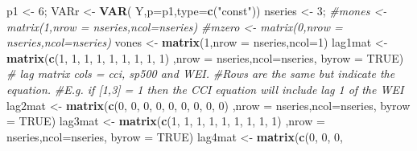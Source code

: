 \documentclass[]{article}
\newenvironment{Shaded}{\begin{snugshade}}{\end{snugshade}}
\newcommand{\KeywordTok}[1]{\textcolor[rgb]{0.13,0.29,0.53}{\textbf{#1}}}
\newcommand{\DataTypeTok}[1]{\textcolor[rgb]{0.13,0.29,0.53}{#1}}
\newcommand{\DecValTok}[1]{\textcolor[rgb]{0.00,0.00,0.81}{#1}}
\newcommand{\StringTok}[1]{\textcolor[rgb]{0.31,0.60,0.02}{#1}}
\newcommand{\CommentTok}[1]{\textcolor[rgb]{0.56,0.35,0.01}{\textit{#1}}}
\newcommand{\OtherTok}[1]{\textcolor[rgb]{0.56,0.35,0.01}{#1}}
\newcommand{\NormalTok}[1]{#1}
\begin{document}
\begin{Shaded}
\begin{Highlighting}[]
\NormalTok{p1        <-}\StringTok{ }\DecValTok{6}\NormalTok{;}
\NormalTok{VARr     <-}\StringTok{ }\KeywordTok{VAR}\NormalTok{( Y,}\DataTypeTok{p=}\NormalTok{p1,}\DataTypeTok{type=}\KeywordTok{c}\NormalTok{(}\StringTok{"const"}\NormalTok{))}
\NormalTok{nseries  <-}\StringTok{ }\DecValTok{3}\NormalTok{;}
\CommentTok{#mones    <- matrix(1,nrow = nseries,ncol=nseries) }
\CommentTok{#mzero    <- matrix(0,nrow = nseries,ncol=nseries) }
\NormalTok{vones    <-}\StringTok{ }\KeywordTok{matrix}\NormalTok{(}\DecValTok{1}\NormalTok{,}\DataTypeTok{nrow =}\NormalTok{ nseries,}\DataTypeTok{ncol=}\DecValTok{1}\NormalTok{)}
\NormalTok{lag1mat <-}\StringTok{ }\KeywordTok{matrix}\NormalTok{(}\KeywordTok{c}\NormalTok{(}\DecValTok{1}\NormalTok{, }\DecValTok{1}\NormalTok{, }\DecValTok{1}\NormalTok{,}
                    \DecValTok{1}\NormalTok{, }\DecValTok{1}\NormalTok{, }\DecValTok{1}\NormalTok{,}
                    \DecValTok{1}\NormalTok{, }\DecValTok{1}\NormalTok{, }\DecValTok{1}\NormalTok{)}
\NormalTok{                  ,}\DataTypeTok{nrow =}\NormalTok{ nseries,}\DataTypeTok{ncol=}\NormalTok{nseries, }\DataTypeTok{byrow =} \OtherTok{TRUE}\NormalTok{) }
\CommentTok{# lag matrix cols = cci, sp500 and WEI. }
\CommentTok{#Rows are the same but indicate the equation.}
\CommentTok{#E.g. if [1,3] = 1 then the CCI equation will include lag 1 of the WEI}
\NormalTok{lag2mat <-}\StringTok{ }\KeywordTok{matrix}\NormalTok{(}\KeywordTok{c}\NormalTok{(}\DecValTok{0}\NormalTok{, }\DecValTok{0}\NormalTok{, }\DecValTok{0}\NormalTok{,}
                    \DecValTok{0}\NormalTok{, }\DecValTok{0}\NormalTok{, }\DecValTok{0}\NormalTok{,}
                    \DecValTok{0}\NormalTok{, }\DecValTok{0}\NormalTok{, }\DecValTok{0}\NormalTok{)}
\NormalTok{                  ,}\DataTypeTok{nrow =}\NormalTok{ nseries,}\DataTypeTok{ncol=}\NormalTok{nseries, }\DataTypeTok{byrow =} \OtherTok{TRUE}\NormalTok{)}
\NormalTok{lag3mat <-}\StringTok{ }\KeywordTok{matrix}\NormalTok{(}\KeywordTok{c}\NormalTok{(}\DecValTok{1}\NormalTok{, }\DecValTok{1}\NormalTok{, }\DecValTok{1}\NormalTok{,}
                    \DecValTok{1}\NormalTok{, }\DecValTok{1}\NormalTok{, }\DecValTok{1}\NormalTok{,}
                    \DecValTok{1}\NormalTok{, }\DecValTok{1}\NormalTok{, }\DecValTok{1}\NormalTok{)}
\NormalTok{                  ,}\DataTypeTok{nrow =}\NormalTok{ nseries,}\DataTypeTok{ncol=}\NormalTok{nseries, }\DataTypeTok{byrow =} \OtherTok{TRUE}\NormalTok{)}
\NormalTok{lag4mat <-}\StringTok{ }\KeywordTok{matrix}\NormalTok{(}\KeywordTok{c}\NormalTok{(}\DecValTok{0}\NormalTok{, }\DecValTok{0}\NormalTok{, }\DecValTok{0}\NormalTok{,}

\end{Highlighting}
\end{Shaded}
\end{document}

